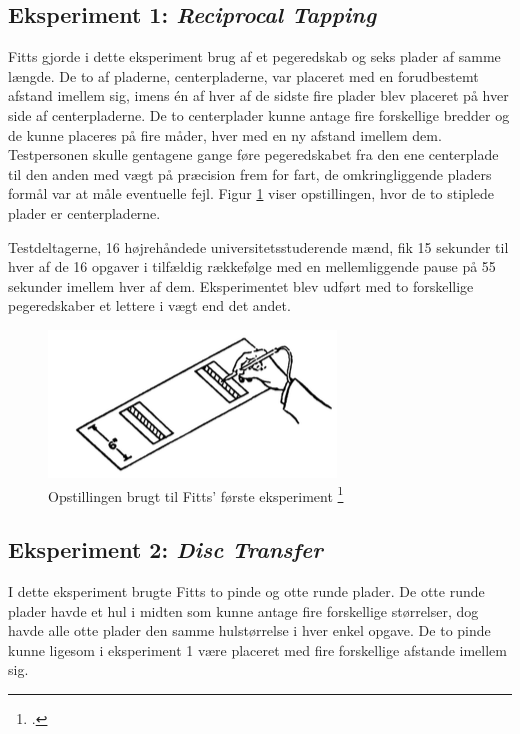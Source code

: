 \subsection*{Eksperiment 1: \textit{Reciprocal Tapping}}
Fitts gjorde i dette eksperiment brug af et pegeredskab og seks plader af samme længde. De to af pladerne, centerpladerne, var placeret med en forudbestemt afstand imellem sig, imens én af hver af de sidste fire plader blev placeret på hver side af centerpladerne. De to centerplader kunne antage fire forskellige bredder og de kunne placeres på fire måder, hver med en ny afstand imellem dem. Testpersonen skulle gentagene gange føre pegeredskabet fra den ene centerplade til den anden med vægt på præcision frem for fart, de omkringliggende pladers formål var at måle eventuelle fejl. Figur \ref{fig:FittsEx1} viser opstillingen, hvor de to stiplede plader er centerpladerne.

Testdeltagerne, 16 højrehåndede universitetsstuderende mænd, fik 15 sekunder til hver af de 16 opgaver i tilfældig rækkefølge med en mellemliggende pause på 55 sekunder imellem hver af dem. Eksperimentet blev udført med to forskellige pegeredskaber et lettere i vægt end det andet.

\begin{figure}[h]
\centering
\includegraphics{billeder/FittsEx1.png}
\caption{Opstillingen brugt til Fitts' første eksperiment \footcite{fitts1954}}
  \label{fig:FittsEx1}
\end{figure}

\subsection*{Eksperiment 2: \textit{Disc Transfer}}
I dette eksperiment brugte Fitts to pinde og otte runde plader. De otte runde plader havde et hul i midten som kunne antage fire forskellige størrelser, dog havde alle otte plader den samme hulstørrelse i hver enkel opgave. De to pinde kunne ligesom i eksperiment 1 være placeret med fire forskellige afstande imellem sig. 

